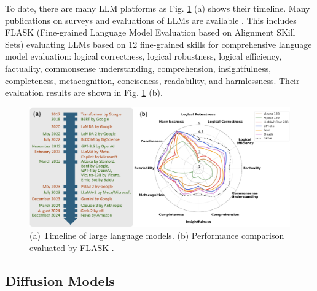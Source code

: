 \documentclass[11pt,a4paper]{article}
\begin{document}
To date, there are many LLM platforms as Fig. \ref{fig:FLASK_LLM_and_history} (a) shows their timeline. Many publications on surveys and evaluations of LLMs are available \cite{zhao:survey:2023,Chang:Survey:2024,YAO:Survey:2024}. This includes FLASK (Fine-grained Language Model Evaluation based on Alignment SKill Sets) \cite{Ye:FLASK:2024} evaluating LLMs based on 12 fine-grained skills for comprehensive language model evaluation: logical correctness, logical robustness, logical efficiency, factuality, commonsense understanding, comprehension, insightfulness, completeness, metacognition, conciseness, readability, and harmlessness. Their evaluation results are shown in Fig. \ref{fig:FLASK_LLM_and_history} (b).

\begin{figure}
    \centering
    \includegraphics[width=\textwidth]{figures/FLASK_LLM_and_history.png}
    \caption{(a) Timeline of large language models. (b) Performance comparison evaluated by FLASK \cite{Ye:FLASK:2024}.}
    \label{fig:FLASK_LLM_and_history}
\end{figure}



\subsection{Diffusion Models}
\label{ssec:DMs}
\end{document}
